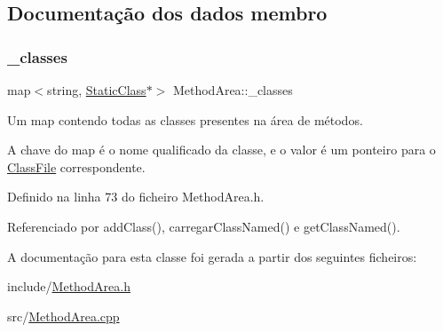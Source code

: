 \subsection{Documentação dos dados membro}
\mbox{\label{classMethodArea_a1244d392d351920d754db8c6940dd7aa}} 
\subsubsection{\texorpdfstring{\+\_\+classes}{\_classes}}
{\footnotesize\ttfamily map$<$string, \hyperlink{classStaticClass}{Static\+Class}$\ast$$>$ Method\+Area\+::\+\_\+classes\hspace{0.3cm}{\ttfamily [private]}}

Um {\ttfamily map} contendo todas as classes presentes na área de métodos.

A chave do map é o nome qualificado da classe, e o valor é um ponteiro para o {\ttfamily \hyperlink{classClassFile}{Class\+File}} correspondente. 

Definido na linha 73 do ficheiro Method\+Area.\+h.



Referenciado por add\+Class(), carregar\+Class\+Named() e get\+Class\+Named().



A documentação para esta classe foi gerada a partir dos seguintes ficheiros\+:\begin{DoxyCompactItemize}
\item 
include/\hyperlink{MethodArea_8h}{Method\+Area.\+h}\item 
src/\hyperlink{MethodArea_8cpp}{Method\+Area.\+cpp}\end{DoxyCompactItemize}
